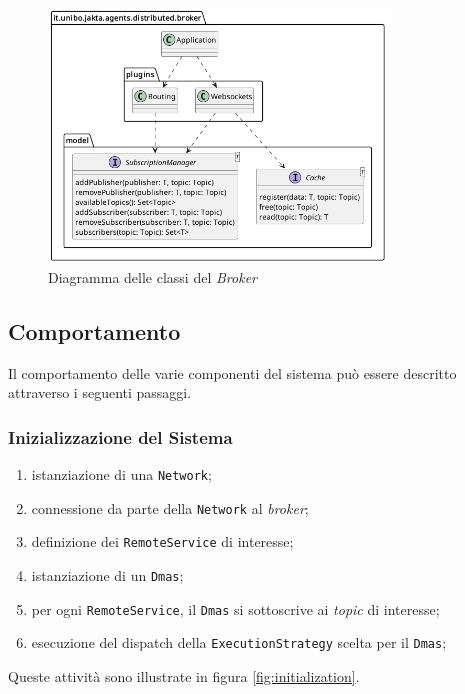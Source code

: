 \begin{figure}[ht!]
    \centering
    \includegraphics[width=0.8\textwidth]{figures/broker-class-diagram.png}
    \caption{Diagramma delle classi del \textit{Broker}}
    \label{fig:broker-class-diagram}
\end{figure}

\subsection{Comportamento}
Il comportamento delle varie componenti del sistema può essere descritto attraverso i seguenti passaggi.

\subsubsection{Inizializzazione del Sistema}

\begin{enumerate}
    \item istanziazione di una \texttt{Network};
    \item connessione da parte della \texttt{Network} al \textit{broker};
    \item definizione dei \texttt{RemoteService} di interesse;
    \item istanziazione di un \texttt{Dmas};
    \item per ogni \texttt{RemoteService}, il \texttt{Dmas} si sottoscrive ai \textit{topic} di interesse;
    \item esecuzione del dispatch della \texttt{ExecutionStrategy} scelta per il \texttt{Dmas};
\end{enumerate}

Queste attività sono illustrate in figura \ref{fig:initialization}.

